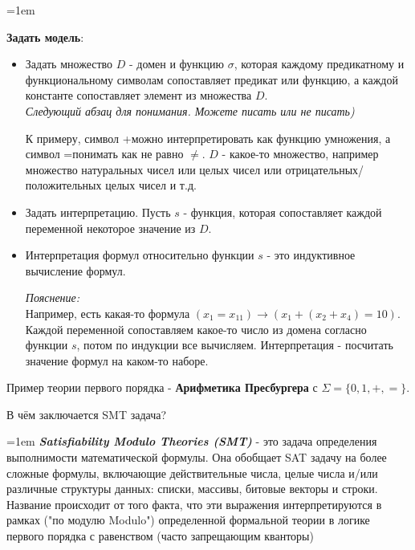 \documentclass[12pt]{extreport}
\theoremstyle{definiton}
\theoremstyle{definition}
\theoremstyle{definition}
\newcommand{\solution}[2][\color{myblue}Ответ]{
\medskip
	\noindent{\bfseries #1 }{{\color{myblue}\bfseries #2:}}
}
\newenvironment{blockquote}{%
  \par%
  \medskip
  \leftskip=1em%
  \noindent}{%
  \par\medskip}
\begin{document}
\begin{blockquote}
{\textbf{Задать модель}:
\begin{itemize}
    \item Задать множество \(D\) - домен и функцию \(\sigma\), которая каждому предикатному и функциональному символам сопоставляет предикат или функцию, а каждой 
    константе сопоставляет элемент из множества \(D\). \\
    \textit{Следующий абзац для понимания. Можете писать или не писать)}
    \par К примеру, символ \glqq +\grqq\quad можно интерпретировать как функцию умножения, а символ \glqq =\grqq\quad понимать как не равно \(\neq\). 
    \(D\) - какое-то множество, например множество натуральных чисел или целых чисел или отрицательных/положительных целых чисел и т.д.
    
    \item Задать интерпретацию. Пусть \(s\) - функция, которая сопоставляет каждой переменной некоторое значение из \(D\).
    \item Интерпретация формул относительно функции \(s\) - это индуктивное вычисление формул.
    \par 
    \textit{Пояснение:} \\
    Например, есть какая-то формула  \((x_1=x_{11})\rightarrow (x_1+(x_2+x_4)=10)\). Каждой переменной сопоставляем какое-то число из домена согласно функции \(s\),  потом по индукции все вычисляем. Интерпретация - посчитать значение формул на каком-то наборе.
\end{itemize}

Пример теории первого порядка - \textbf{Арифметика Пресбургера} с \(\Sigma=\{0,1,+,=\}\).

}
\end{blockquote}

\Pr[\textcolor{mygreen}{Паша, DONE}] В чём заключается SMT задача?
			
\solution{7}
\begin{blockquote}
{\color{myblue}
\textbf{\textit{Satisfiability Modulo Theories (SMT)}} - это задача определения выполнимости математической формулы. Она обобщает SAT задачу на более сложные формулы, включающие действительные числа, целые числа и/или различные структуры данных: списки, массивы, битовые векторы и строки. Название происходит от того факта, что эти выражения интерпретируются в рамках ("по модулю Modulo") определенной формальной теории в логике первого порядка с равенством (часто запрещающим кванторы)
}
\end{blockquote}
\end{document}
